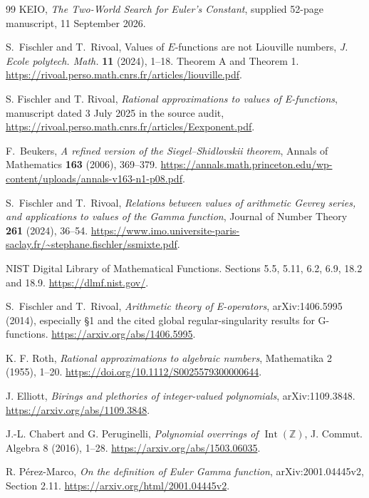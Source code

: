 \documentclass[11pt,a4paper]{article}
\newcommand{\Z}{\mathbb Z}
\DeclareMathOperator{\Int}{Int}
\theoremstyle{definition}
\theoremstyle{remark}
\theoremstyle{plain}
\numberwithin{equation}{section}
\begin{document}
\clearpage
{}
\begin{thebibliography}{99}
 KEIO, \emph{The Two-World Search for Euler's Constant}, supplied 52-page manuscript, 11 September 2026.

 S.~Fischler and T.~Rivoal, Values of $E$-functions are not Liouville numbers, \emph{J. Ecole polytech. Math.} \textbf{11} (2024), 1--18. Theorem A and Theorem 1. \url{https://rivoal.perso.math.cnrs.fr/articles/liouville.pdf}.

 S. Fischler and T. Rivoal,
\emph{Rational approximations to values of E-functions}, manuscript
dated 3 July 2025 in the source audit,
\url{https://rivoal.perso.math.cnrs.fr/articles/Eexponent.pdf}.

 F.~Beukers, \emph{A refined version of the Siegel--Shidlovskii theorem},
Annals of Mathematics \textbf{163} (2006), 369--379.
\url{https://annals.math.princeton.edu/wp-content/uploads/annals-v163-n1-p08.pdf}.

 S.~Fischler and T.~Rivoal, \emph{Relations between values of arithmetic
Gevrey series, and applications to values of the Gamma function},
Journal of Number Theory \textbf{261} (2024), 36--54.
\url{https://www.imo.universite-paris-saclay.fr/~stephane.fischler/ssmixte.pdf}.

 NIST Digital Library of Mathematical Functions. Sections 5.5, 5.11, 6.2, 6.9, 18.2 and 18.9. \url{https://dlmf.nist.gov/}.

 S.~Fischler and T.~Rivoal, \emph{Arithmetic theory of E-operators},
arXiv:1406.5995 (2014), especially \S1 and the cited global
regular-singularity results for G-functions.
\url{https://arxiv.org/abs/1406.5995}.

 K. F. Roth,
\emph{Rational approximations to algebraic numbers},
Mathematika 2 (1955), 1--20.
\url{https://doi.org/10.1112/S0025579300000644}.

 J. Elliott,
\emph{Birings and plethories of integer-valued polynomials},
arXiv:1109.3848.
\url{https://arxiv.org/abs/1109.3848}.

 J.-L. Chabert and G. Peruginelli,
\emph{Polynomial overrings of $\Int(\Z)$},
J. Commut. Algebra 8 (2016), 1--28.
\url{https://arxiv.org/abs/1503.06035}.

 R. P\'erez-Marco,
\emph{On the definition of Euler Gamma function},
arXiv:2001.04445v2, Section 2.11.
\url{https://arxiv.org/html/2001.04445v2}.


\end{thebibliography}
\end{document}
